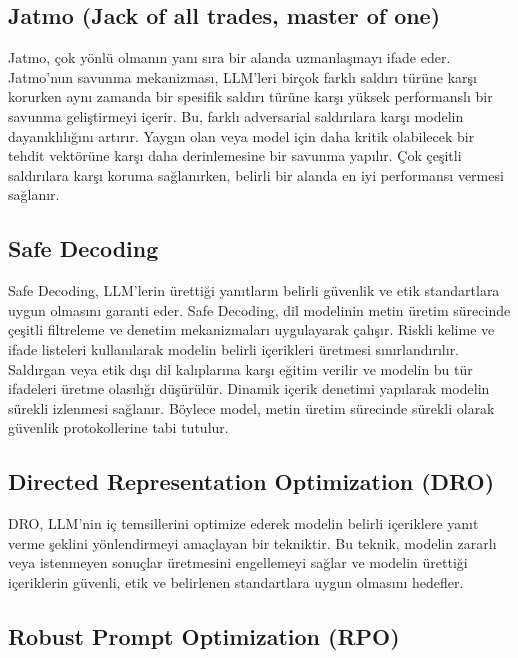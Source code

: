 \newpage

\subsection{Jatmo (Jack of all trades, master of one)}

Jatmo, çok yönlü olmanın yanı sıra bir alanda uzmanlaşmayı ifade eder. Jatmo'nun savunma mekanizması, LLM'leri birçok farklı saldırı türüne karşı korurken aynı zamanda bir spesifik saldırı türüne karşı yüksek performanslı bir savunma geliştirmeyi içerir. Bu, farklı adversarial saldırılara karşı modelin dayanıklılığını artırır. Yaygın olan veya model için daha kritik olabilecek bir tehdit vektörüne karşı daha derinlemesine bir savunma yapılır. Çok çeşitli saldırılara karşı koruma sağlanırken, belirli bir alanda en iyi performansı vermesi sağlanır. 

\newpage

\subsection{Safe Decoding}

Safe Decoding, LLM'lerin ürettiği yanıtların belirli güvenlik ve etik standartlara uygun olmasını garanti eder. Safe Decoding, dil modelinin metin üretim sürecinde çeşitli filtreleme ve denetim mekanizmaları uygulayarak çalışır. Riskli kelime ve ifade listeleri kullanılarak modelin belirli içerikleri üretmesi sınırlandırılır. Saldırgan veya etik dışı dil kalıplarına karşı eğitim verilir ve modelin bu tür ifadeleri üretme olasılığı düşürülür. Dinamik içerik denetimi yapılarak modelin sürekli izlenmesi sağlanır. Böylece model, metin üretim sürecinde sürekli olarak güvenlik protokollerine tabi tutulur.

\newpage

\subsection{Directed Representation Optimization (DRO)}

DRO, LLM'nin iç temsillerini optimize ederek modelin belirli içeriklere yanıt verme şeklini yönlendirmeyi amaçlayan bir tekniktir. Bu teknik, modelin zararlı veya istenmeyen sonuçlar üretmesini engellemeyi sağlar ve modelin ürettiği içeriklerin güvenli, etik ve belirlenen standartlara uygun olmasını hedefler.

\newpage

\subsection{Robust Prompt Optimization (RPO)}

